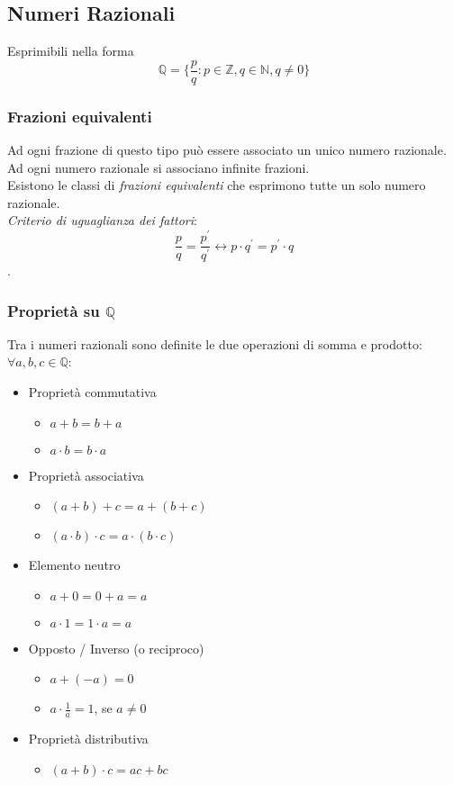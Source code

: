 \documentclass[a4paper,12pt, oneside]{book}
\begin{document}
\subsection{Numeri Razionali}
Esprimibili nella forma
\begin{equation}
	\mathbb{Q} = \{\frac{p}{q} : p\in\mathbb{Z}, q\in\mathbb{N}, q \neq 0 \}
\end{equation}
\subsubsection{Frazioni equivalenti}
Ad ogni frazione di questo tipo può essere associato un unico numero razionale.\\
Ad ogni numero razionale si associano infinite frazioni.\\
Esistono le classi di \textit{frazioni equivalenti} che esprimono tutte un solo numero razionale.\\ \textit{Criterio di uguaglianza dei fattori}:$$\frac{p}{q}=\frac{p^{'}}{q^{'}} \longleftrightarrow p \cdot q^{'}=p^{'} \cdot q$$.
\subsubsection{Proprietà su $\mathbb{Q}$}
Tra i numeri razionali sono definite le due operazioni di somma e prodotto:\\
$\forall a,b,c\in\mathbb{Q}$:
\begin{itemize}
	\item Proprietà commutativa
		\begin{itemize}
			\item $a+b=b+a$
			\item $a \cdot b=b \cdot a$
		\end{itemize}
	\item Proprietà associativa
		\begin{itemize}
			\item $(a+b)+c=a+(b+c)$
			\item $(a\cdot b)\cdot c=a\cdot(b\cdot c)$
		\end{itemize}
	\item Elemento neutro
		\begin{itemize}
			\item $a+0=0+a=a$
			\item $a\cdot 1=1\cdot a=a$
		\end{itemize}
	\item Opposto / Inverso (o reciproco)
		\begin{itemize}
			\item $a+(-a)=0$
			\item $a\cdot\frac1{a}=1$, se $a\neq0$
		\end{itemize}
	\item Proprietà distributiva
		\begin{itemize}
			\item $(a+b)\cdot c=ac+bc$
		\end{itemize}
\end{itemize}
\end{document}
